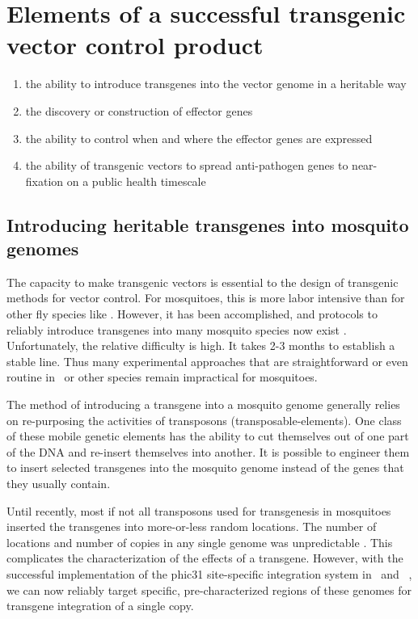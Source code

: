 \section{Elements of a successful transgenic vector control product}

\begin{enumerate}
  \item the ability to introduce transgenes into the vector genome in a heritable way
  \item the discovery or construction of effector genes
  \item the ability to control when and where the effector genes are expressed
  \item the ability of transgenic vectors to spread anti-pathogen genes to near-fixation on a public health timescale
\end{enumerate}



\subsection{Introducing heritable transgenes into mosquito genomes}

The capacity to make transgenic vectors is essential to the design of transgenic methods for vector control.
For mosquitoes, this is more labor intensive than for other fly species like \Dmel.
However, it has been accomplished, and protocols to reliably introduce transgenes into many mosquito species now exist \cite{Adelman2007}.
Unfortunately, the relative difficulty is high.
It takes 2-3 months to establish a stable line.
Thus many experimental approaches that are straightforward or even routine in \Dm\ or other species remain impractical for mosquitoes.

The method of introducing a \gls{transgene} into a mosquito genome generally relies on re-purposing the activities of \glspl{transposon} (\glspl{transposable-element}).
One class of these mobile genetic elements has the ability to cut themselves out of one part of the DNA and re-insert themselves into another.
It is possible to engineer them to insert selected transgenes into the mosquito genome instead of the genes that they usually contain.


Until recently, most if not all transposons used for transgenesis in mosquitoes inserted the transgenes into more-or-less random locations.
The number of locations and number of copies in any single genome was unpredictable \cite{Adelman2004,Sethuraman2007}.
This complicates the characterization of the effects of a transgene.
However, with the successful implementation of the \gls{phic31} site-specific integration system in \Aa\ and \As\ \cite{Thorpe1998,Nimmo2006,Isaacs2012}, we can now reliably target specific, pre-characterized regions of these genomes for transgene integration of a single copy.

